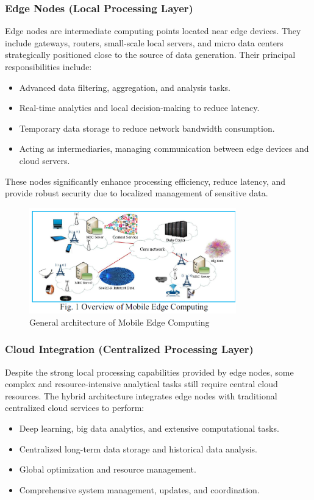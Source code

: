\documentclass[runningheads]{llncs}
\begin{document}
\subsubsection{Edge Nodes (Local Processing Layer)}
Edge nodes are intermediate computing points located near edge devices. They include gateways, routers, small-scale local servers, and micro data centers strategically positioned close to the source of data generation. Their principal responsibilities include:
\begin{itemize}
    \item Advanced data filtering, aggregation, and analysis tasks.
    \item Real-time analytics and local decision-making to reduce latency.
    \item Temporary data storage to reduce network bandwidth consumption.
    \item Acting as intermediaries, managing communication between edge devices and cloud servers.
\end{itemize}

These nodes significantly enhance processing efficiency, reduce latency, and provide robust security due to localized management of sensitive data.

\begin{figure}[ht]
    \centering
    \includegraphics[width=0.8\textwidth]{IMG/4.png}
    \caption{General architecture of Mobile Edge Computing}
    \label{fig:mec_architecture}
    \end{figure}
\FloatBarrier

\subsubsection{Cloud Integration (Centralized Processing Layer)}
Despite the strong local processing capabilities provided by edge nodes, some complex and resource-intensive analytical tasks still require central cloud resources. The hybrid architecture integrates edge nodes with traditional centralized cloud services to perform:
\begin{itemize}
    \item Deep learning, big data analytics, and extensive computational tasks.
    \item Centralized long-term data storage and historical data analysis.
    \item Global optimization and resource management.
    \item Comprehensive system management, updates, and coordination.
\end{itemize}
\end{document}
